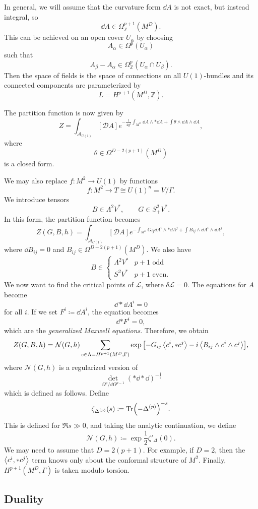 \documentclass[leqno, openany]{memoir}
\theoremstyle{definition}
\theoremstyle{remark}
\theoremstyle{plain}
\theoremstyle{definition}
\theoremstyle{remark}
\newcommand{\Z}{\mathbb{Z}}
\newcommand{\mc}[1]{\mathcal{#1}}
\begin{document}
In general, we will assume that the curvature form $\dd{A}$ is not exact, but instead integral, so
\[ \dd{A} \in \Omega^{p+1}_{\Z}(M^D). \]
This can be achieved on an open cover $U_{\alpha}$ by choosing
\[ A_{\alpha} \in \Omega^p(U_{\alpha}) \]
such that 
\[ A_{\beta} - A_{\alpha} \in \Omega^p_{\Z}(U_{\alpha} \cap U_{\beta}). \]
Then the space of fields is the space of connections on all $U(1)$-bundles and its connected components are parameterized by
\[ L = H^{p+1}(M^D, \Z). \]

The partition function is now given by
\[ Z = \int_{\mc{A}_{U(1)}} [\mc{D}A] e^{-\frac{1}{4g^2} \int_{M^D} \dd{A} \wedge * \dd{A} + \int \theta \wedge \dd{A} \wedge \dd{A}}, \]
where
\[ \theta \in \Omega^{D-2(p+1)}(M^D) \]
is a closed form.

We may also replace $f \colon M^2 \to U(1)$ by functions
\[ f \colon M^2 \to T \cong U(1)^n = V/\Gamma. \]
We introduce tensors 
\[ B \in \Lambda^2 V^*, \qquad G \in S^2_+ V^*. \]
In this form, the partition function becomes
\[ Z(G,B,h) = \int_{\mc{A}_{U(1)}} [\mc{D}A] e^{-\int_{M^D} G_{ij} \dd{A^i} \wedge * \dd{A^j} + \int B_{ij} \wedge \dd{A^i} \wedge \dd{A^j}}, \]
where $\dd{B_{ij}} = 0$ and $B_{ij} \in \Omega^{D-2(p+1)}(M^D)$. We also have
\[ B \in \begin{cases}
    \Lambda^2 V^* & p+1 \text{ odd} \\
    S^2 V^* & p+1 \text{ even}.
\end{cases}
\]
We now want to find the critical points of $\mc{L}$, where $\delta \mc{L} = 0$. The equations for $A$ become
\[ \dd * \dd{A^i} = 0 \]
for all $i$. If we set $F^i \coloneqq \dd{A^i}$, the equation becomes 
\[ \dd{*F^i} = 0, \]
which are the \textit{generalized Maxwell equations}. Therefore, we obtain
\[ Z(G,B,h) = \mc{N}(G,h) \sum_{c \in \Lambda = H^{p+1}(M^D, \Gamma)} \exp\qty[-G_{ij} \ev{c^i,*c^j} - i \ev{B_{ij} \wedge c^i \wedge c^j}], \]
where $\mc{N}(G,h)$ is a regularized version of
\[ \det_{\Omega^p/\dd{\Omega^{p-1}}}(*\dd*\dd)^{-\frac{1}{2}} \]
which is defined as follows. Define
\[ \zeta_{\Delta^{(p)}}(s) \coloneqq \Tr(-\Delta^{(p)})^{-s}. \]
This is defined for $\Re s \gg 0$, and taking the analytic continuation, we define
\[ \mc{N}(G,h) \coloneqq \exp \frac{1}{2} \zeta'_{{\Delta}}(0). \]
We may need to assume that $D = 2(p+1)$. For example, if $D=2$, then the $\ev{c^i, * c^j}$ term knows only about the conformal structure of $M^2$. Finally, $H^{p+1}(M^D, \Gamma)$ is taken modulo torsion.

\subsection{Duality}
\end{document}

